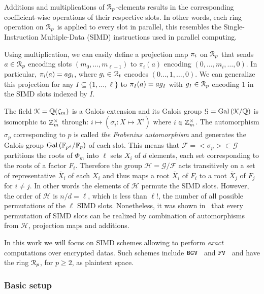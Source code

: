 Additions and multiplications of $\mathcal{R}_p$-elements results in the corresponding coefficient-wise operations of their respective slots. In other words, each ring operation on $\mathcal{R}_p$ is applied to every slot in parallel, this resembles the Single-Instruction Multiple-Data (SIMD) instructions used in parallel computing.

Using multiplication, we can easily define a projection map $\pi_i$ on $\mathcal{R}_p$ that sends $a \in \mathcal{R}_p$ encoding slots $(m_0, \dots, m_{\ell-1})$ to $\pi_i(a)$ encoding $(0, \dots, m_i, \dots, 0)$.
In particular, $\pi_i(a) = a g_i$, where $g_i \in \mathcal{R}_t$ encodes $(0 \dots, 1, \dots, 0)$.
We can generalize this projection for any $I \subseteq \{1,\dots,\ell\}$ to $\pi_I(a) = a g_I$ with $g_I \in \mathcal{R}_p$ encoding $1$ in the SIMD slots indexed by $I$.\newline

The field $\mathcal{K} = \mathbb{Q}(\zeta_{m})$ is a Galois extension and its Galois group $\mathcal{G} = \operatorname{Gal}{(\mathcal{K}/\mathbb{Q})}$ is isomorphic to $\mathbb{Z}_m^\times$  through: $i \mapsto (\sigma_i: X \mapsto X^i)$ where $i \in \mathbb{Z}_m^\times$. The automorphism $\sigma_p$ corresponding to $p$ is called \emph{the Frobenius automorphism} and generates the Galois group $\operatorname{Gal}{(\mathbb{F}_{p^d}/\mathbb{F}_p)}$ of each slot. This means that $\mathcal{F} = <\sigma_p>\subset \mathcal{G}$ partitions the roots of $\Phi_m$  into $\ell$ sets $X_i$ of $d$ elements, each set corresponding to the roots of a factor $F_i$. Therefore the group $\mathcal{H} = \mathcal{G}/\mathcal{F}$ acts transitively on a set of representative $\bar{X}_i$ of each $X_i$ and thus maps a root $\bar{X}_i$ of $F_i$ to a root $\bar{X}_j$ of $F_j$ for $i\neq j$. In other words the elements of $\mathcal{H}$ permute the SIMD slots. However, the order of $\mathcal{H}$ is $n/d = \ell$, which is less than $\ell!$, the number of all possible permutations of the $\ell$ SIMD slots. Nonetheless, it was shown in~\cite{GHS12} that every permutation of SIMD slots can be realized by combination of automorphisms from $\mathcal{H}$, projection maps and additions.\newline

In this work we will focus on SIMD schemes allowing to perform \emph{exact} computations over encrypted datas. Such schemes include $\mathtt{BGV}$~\cite{BGV12} and $\mathtt{FV}$~\cite{FV12} and have the ring $\mathcal{R}_p$, for $p\geq 2$, as plaintext space.

\subsubsection{Basic setup}

